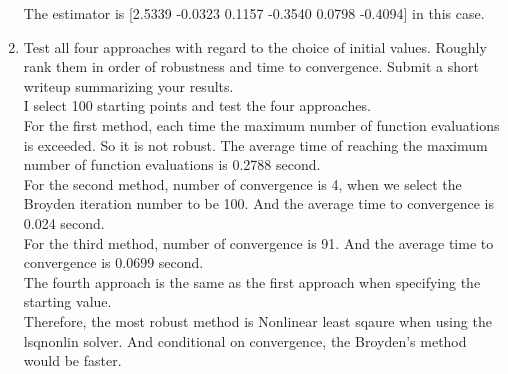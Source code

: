 \documentclass{article}
\begin{document}
\begin{enumerate}
The estimator is [2.5339   -0.0323    0.1157   -0.3540    0.0798   -0.4094] in this case. \\[3em]


\item Test all four approaches with regard to the choice of initial values.  Roughly rank them in order of 
robustness and time to convergence. Submit a short writeup summarizing your results.  \\[2em]

I select 100 starting points  and test the four approaches.\\

For the first method, each time the maximum number of function evaluations is exceeded. So it is not robust. The average time of reaching the maximum number of function evaluations is 0.2788 second.\\
For the second method, number of convergence is 4, when we select the Broyden iteration number to be 100. And the average time to convergence is 0.024 second.\\
For the third method, number of convergence is 91. And the average time to convergence is 0.0699 second.\\
The fourth approach is the same as the first approach when specifying the starting value. \\
Therefore, the most robust method is Nonlinear least sqaure when using the lsqnonlin solver. And conditional on convergence, the Broyden's method would be faster. 








\end{enumerate}
\end{document}
